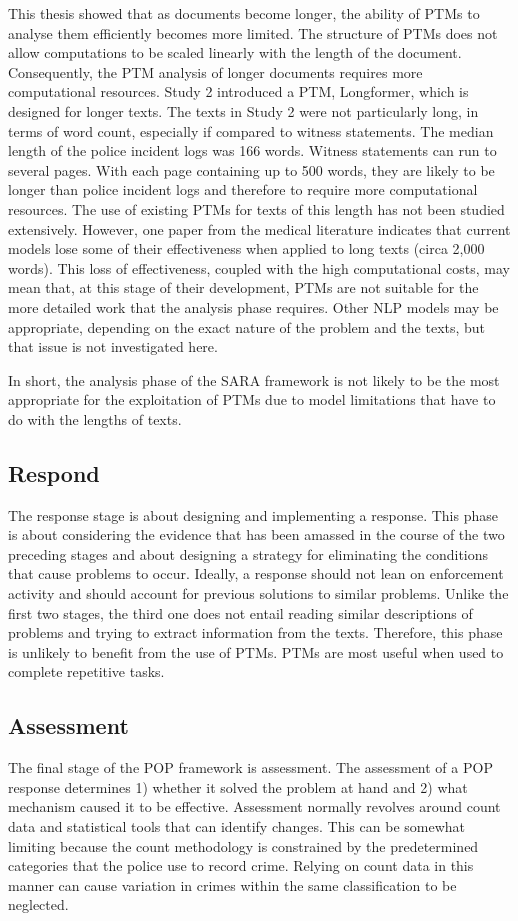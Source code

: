 This thesis showed that as documents become longer, the ability of PTMs to analyse them efficiently becomes more limited. The structure of PTMs does not allow computations to be scaled linearly with the length of the document. Consequently, the PTM analysis of longer documents requires more computational resources. Study 2 introduced a PTM, Longformer, which is designed for longer texts. The texts in Study 2 were not particularly long, in terms of word count, especially if compared to witness statements. The median length of the police incident logs was 166 words. Witness statements can run to several pages. With each page containing up to 500 words, they are likely to be longer than police incident logs and therefore to require more computational resources. The use of existing PTMs for texts of this length has not been studied extensively. However, one paper from the medical literature \parencite{limitations_of_transformers}  indicates that current models lose some of their effectiveness when applied to long texts (circa 2,000 words). This loss of effectiveness, coupled with the high computational costs, may mean that, at this stage of their development, PTMs are not suitable for the more detailed work that the analysis phase requires. Other NLP models may be appropriate, depending on the exact nature of the problem and the texts, but that issue is not investigated here.

In short, the analysis phase of the SARA framework is not likely to be the most appropriate for the exploitation of PTMs due to model limitations that have to do with the lengths of texts.


\subsection{Respond} The response stage is about designing and implementing a response. This phase is about considering the evidence that has been amassed in the course of the two preceding stages and about designing a strategy for eliminating the conditions that cause problems to occur. Ideally, a response should not lean on enforcement activity and should account for previous solutions to similar problems. Unlike the first two stages, the third one does not entail reading similar descriptions of problems and trying to extract information from the texts. Therefore, this phase is unlikely to benefit from the use of PTMs. PTMs are most useful when used to complete repetitive tasks. 

  
\subsection{Assessment}The final stage of the POP framework is assessment. The assessment of a POP response determines 1) whether it solved the problem at hand and 2) what mechanism caused it to be effective. Assessment normally revolves around count data and statistical tools that can identify changes. This can be somewhat limiting because the count methodology is constrained by the predetermined categories that the police use to record crime. Relying on count data in this manner can cause variation in crimes within the same classification to be neglected.

